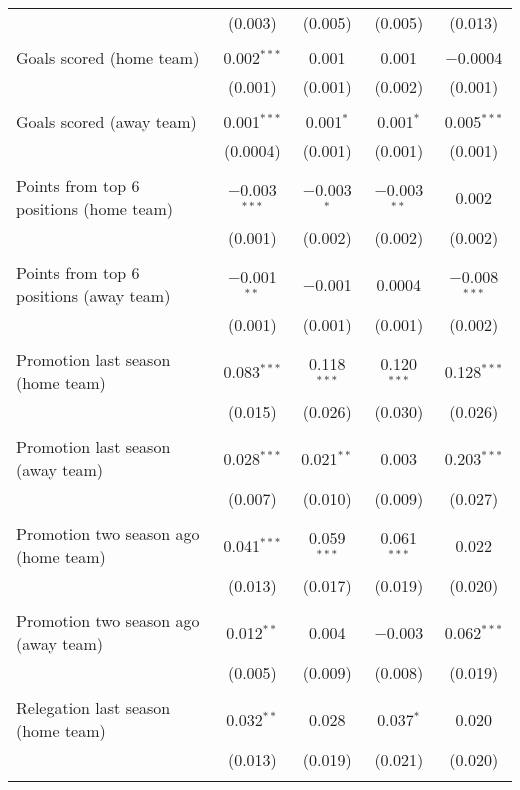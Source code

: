 \begin{tabular}{@{\extracolsep{5pt}}lcccc}
  & (0.003) & (0.005) & (0.005) & (0.013) \\ 
  & & & & \\ 
 Goals scored (home team) & 0.002$^{***}$ & 0.001 & 0.001 & $-$0.0004 \\ 
  & (0.001) & (0.001) & (0.002) & (0.001) \\ 
  & & & & \\ 
 Goals scored (away team) & 0.001$^{***}$ & 0.001$^{*}$ & 0.001$^{*}$ & 0.005$^{***}$ \\ 
  & (0.0004) & (0.001) & (0.001) & (0.001) \\ 
  & & & & \\ 
 Points from top 6 positions (home team) & $-$0.003$^{***}$ & $-$0.003$^{*}$ & $-$0.003$^{**}$ & 0.002 \\ 
  & (0.001) & (0.002) & (0.002) & (0.002) \\ 
  & & & & \\ 
 Points from top 6 positions (away team) & $-$0.001$^{**}$ & $-$0.001 & 0.0004 & $-$0.008$^{***}$ \\ 
  & (0.001) & (0.001) & (0.001) & (0.002) \\ 
  & & & & \\ 
 Promotion last season  (home team) & 0.083$^{***}$ & 0.118$^{***}$ & 0.120$^{***}$ & 0.128$^{***}$ \\ 
  & (0.015) & (0.026) & (0.030) & (0.026) \\ 
  & & & & \\ 
 Promotion last season  (away team) & 0.028$^{***}$ & 0.021$^{**}$ & 0.003 & 0.203$^{***}$ \\ 
  & (0.007) & (0.010) & (0.009) & (0.027) \\ 
  & & & & \\ 
 Promotion two season ago (home team) & 0.041$^{***}$ & 0.059$^{***}$ & 0.061$^{***}$ & 0.022 \\ 
  & (0.013) & (0.017) & (0.019) & (0.020) \\ 
  & & & & \\ 
 Promotion two season ago (away team) & 0.012$^{**}$ & 0.004 & $-$0.003 & 0.062$^{***}$ \\ 
  & (0.005) & (0.009) & (0.008) & (0.019) \\ 
  & & & & \\ 
 Relegation last season  (home team) & 0.032$^{**}$ & 0.028 & 0.037$^{*}$ & 0.020 \\ 
  & (0.013) & (0.019) & (0.021) & (0.020) \\ 
  & & & & \\ 

\end{tabular}
